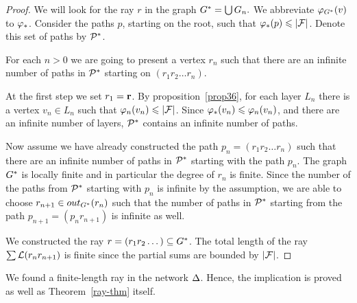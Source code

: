 \documentclass[12pt,oneside,a4paper]{amsart}
\begin{document}
          \begin{proof}
            We will look for the ray $r$ in the graph $\gstar = \bigcup G_n.$
            We abbreviate $\phi_{\gstar}(v)$ to $\phistar$.
            Consider the paths $p$, starting on the root, such that $\phistar(p) \leq \lvert\flowpos\rvert$.
            Denote this set of paths by $\cal{P}^*$.

            For each $n > 0$ we are going to present a vertex $r_n$ such that there are an infinite number of paths
              in $\cal{P}^*$ starting on $(r_1 r_2 \dots r_n)$.

            At the first step we set $r_1 = \root$.
            By proposition~\ref{prop36}, for each layer $L_n$ there is a vertex $v_n \in L_n$ such that
              $\phi_n(v_n) \leq \lvert\flowpos\rvert$.
            Since $\phistar(v_n) \leq \phi_n(v_n)$, and there are an infinite number of layers,
              $\cal{P}^*$ contains an infinite number of paths.

            Now assume we have already constructed the path $p_n = (r_1 r_2\dots r_n)$ such that
              there are an infinite number of paths in $\cal{P}^*$ starting with the path $p_n$.
            The graph $\gstar$ is locally finite and in particular the degree of $r_n$ is finite.
            Since the number of the paths from $\cal{P}^*$ starting with $p_n$ is infinite by the assumption,
              we are able to choose $r_{n+1} \in \eout_{G^*}(r_n)$ such that the number of paths in $\cal{P}^*$ starting from
              the path $p_{n+1}= (p_n r_{n + 1})$ is infinite as well.

            We constructed the ray $r = (r_1 r_2 \dots) \subseteq \gstar$.
            The total length of the ray $\sum \len(r_n r_{n+1})$ is finite
              since the partial sums are bounded by $\lvert \flowpos \rvert$.
          \end{proof}
          We found a finite-length ray in the network $\net$.
          Hence, the implication is proved as well as Theorem~\ref{ray-thm} itself.

      \medskip
\end{document}
